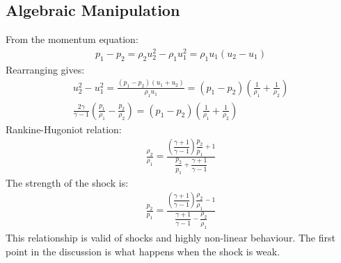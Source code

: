 \documentclass[class=report, crop=false, 12pt,a4paper]{standalone}
\begin{document}
\subsection{Algebraic Manipulation}
From the momentum equation: 
\begin{gather}
    p_1 - p_2 = \rho_2 u_2^2 - \rho_1 u_1^2 = \rho_1 u_1 (u_2-u_1)
\end{gather}
Rearranging gives: 
\begin{gather}
    u_2^2 - u_1^2 = \frac{(p_1-p_2)(u_1+u_2)}{\rho_1 u_1} = (p_1-p_2) \left( \frac{1}{\rho_1} + \frac{1}{\rho_2} \right) \\[5pt]
    \frac{2\gamma}{\gamma-1} \left( \frac{p_1}{\rho_1} - \frac{p_2}{\rho_2} \right) = (p_1-p_2) \left( \frac{1}{\rho_1} + \frac{1}{\rho_2} \right)
\end{gather}
Rankine-Hugoniot relation: 
\begin{gather}
    \frac{\rho_2}{\rho_1} = \frac{\left(\dfrac{\gamma+1}{\gamma-1}\right)\dfrac{p_2}{p_1}+1}{\dfrac{p_2}{p_1} + \dfrac{\gamma+1}{\gamma-1}}
\end{gather}
The strength of the shock is: 
\begin{gather}
    \frac{p_2}{p_1} = \frac{\left(\dfrac{\gamma+1}{\gamma-1}\right)\dfrac{\rho_2}{\rho_1}-1}{\dfrac{\gamma+1}{\gamma-1} - \dfrac{\rho_2}{\rho_1}}
\end{gather}
This relationship is valid of shocks and highly non-linear behaviour. 
The first point in the discussion is what happens when the shock is weak. 
\end{document}
